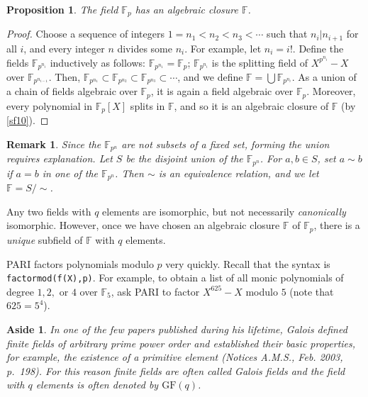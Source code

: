 \documentclass[a4paper,11pt,final,openany]{memoir}
\newtheorem{proposition}[X]{Proposition}
\newtheorem{remark}[X]{Remark}
\newtheorem{aside}[X]{Aside}
\theoremstyle{nonumberplain}
\newtheorem{proof}{Proof.}
\begin{document}
\begin{proposition}
\label{cg18n}The field $\mathbb{F}{}_{p}$ has an algebraic closure
$\mathbb{F}{}$.
\end{proposition}

\begin{proof}
Choose a sequence of integers $1=n_{1}<n_{2}<n_{3}<\cdots$ such that
$n_{i}|n_{i+1}$ for all $i$, and every integer $n$ divides some $n_{i}$. For
example, let $n_{i}=i!$. Define the fields $\mathbb{F}{}_{p^{n_{i}}}$
inductively as follows: $\mathbb{F}{}_{p^{n_{1}}}=\mathbb{F}{}_{p}$;
$\mathbb{F}{}_{p^{n_{i}}}$ is the splitting field of $X^{p^{n_{i}}}-X$ over
$\mathbb{F}{}_{p^{n_{i-1}}}$. Then, $\mathbb{F}{}_{p^{n_{1}}}\subset
\mathbb{F}{}_{p^{n_{2}}}\subset\mathbb{F}{}_{p^{n_{3}}}\subset\cdots$, and we
define $\mathbb{F}{}=\bigcup\mathbb{F}{}_{p^{n_{i}}}$. As a union of a chain
of fields algebraic over $\mathbb{F}{}_{p}$, it is again a field algebraic
over $\mathbb{F}{}_{p}$. Moreover, every polynomial in $\mathbb{F}{}_{p}[X]$
splits in $\mathbb{F}{}$, and so it is an algebraic closure of $\mathbb{F}{}$
(by \ref{sf10}).
\end{proof}

\begin{remark}
\label{sf13m}Since the $\mathbb{F}{}_{p^{n}}$ are not subsets of a fixed set,
forming the union requires explanation. Let $S$ be the disjoint union of the
$\mathbb{F}{}_{p^{n}}$. For $a,b\in S$, set $a\sim b$ if $a=b$ in one of the
$\mathbb{F}{}_{p^{n}}$. Then $\sim$ is an equivalence relation, and we let
$\mathbb{F}{}=S/\sim$.
\end{remark}

Any two fields with $q$ elements are isomorphic, but not necessarily
\textit{canonically} isomorphic. However, once we have chosen an algebraic
closure $\mathbb{F}{}$ of $\mathbb{F}{}_{p}$, there is a \textit{unique}
subfield of $\mathbb{F}{}$ with $q$ elements.

PARI%
factors polynomials modulo $p$ very quickly. Recall that the syntax is
\newline\texttt{factormod(f(X),p)}. For example, to obtain a list of all monic
polynomials of degree $1,2,$ or $4$ over $\mathbb{F}_{5}$, ask PARI to factor
$X^{625}-X$ modulo $5$ (note that $625=5^{4}$).

\begin{aside}
\label{cg18a}In one of the few papers published during his lifetime, Galois
defined finite fields of arbitrary prime power order and established their
basic properties, for example, the existence of a primitive element (Notices
A.M.S., Feb. 2003, p.~198). For this reason finite fields are often called
\emph{Galois fields}%
and the field with $q$ elements is often denoted by $\mathrm{GF}(q)$.
\end{aside}
\end{document}
